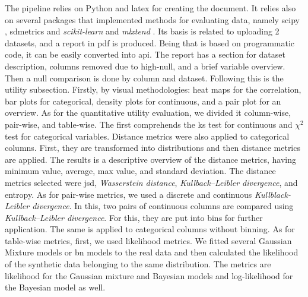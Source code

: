 The pipeline relies on Python and latex for creating the document. It relies also on several packages that implemented methods for evaluating data, namely scipy \cite{scipy}, sdmetrics \cite{sdv} and \textit{scikit-learn} \cite{scikit-learn} and \textit{mlxtend} \cite{mlxtend}. Its basis is related to uploading 2 datasets, and a report in pdf is produced. Being that is based on programmatic code, it can be easily converted into \ac{api}.
The report has a section for dataset description, columns removed due to high-null, and a brief variable overview. Then a null comparison is done by column and dataset. Following this is the utility subsection. Firstly, by visual methodologies: heat maps for the correlation, bar plots for categorical, density plots for continuous, and a pair plot for an overview. As for the quantitative utility evaluation, we divided it column-wise, pair-wise, and table-wise. The first comprehends the \ac{ks} test for continuous and $\chi^2$ test for categorical variables.  Distance metrics were also applied to categorical columns. First, they are transformed into distributions and then distance metrics are applied. The results is a descriptive overview of the distance metrics, having minimum value, average, max value, and standard deviation. The distance metrics selected were \ac{jsd}, \textit{Wasserstein distance}, \textit{Kullback–Leibler divergence}, and entropy.
As for pair-wise metrics, we used a discrete and continuous \textit{Kullblack-Leibler divergence}. In this, two pairs of continuous columns are compared using \textit{Kullback–Leibler divergence}. For this, they are put into bins for further application. The same is applied to categorical columns without binning.
As for table-wise metrics, first, we used likelihood metrics. We fitted several Gaussian Mixture models or \ac{bn} models to the real data and then calculated the likelihood of the synthetic data belonging to the same distribution. The metrics are likelihood for the Gaussian mixture and Bayesian models and log-likelihood for the Bayesian model as well.


